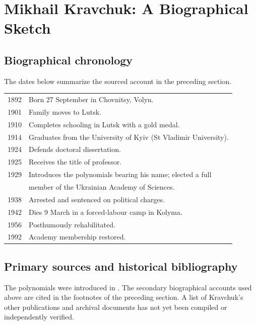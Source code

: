 \chapter{Mikhail Kravchuk: A Biographical Sketch}
\label{app:biography}


\section{Biographical chronology}
The dates below summarize the sourced account in the preceding section.
\begin{center}
\begin{tabular}{rl}
1892 & Born 27 September in Chovnitsy, Volyn.\\
1901 & Family moves to Lutsk.\\
1910 & Completes schooling in Lutsk with a gold medal.\\
1914 & Graduates from the University of Kyiv (St Vladimir University).\\
1924 & Defends doctoral dissertation.\\
1925 & Receives the title of professor.\\
1929 & Introduces the polynomials bearing his name; elected a full\\
     & member of the Ukrainian Academy of Sciences.\\
1938 & Arrested and sentenced on political charges.\\
1942 & Dies 9 March in a forced-labour camp in Kolyma.\\
1956 & Posthumously rehabilitated.\\
1992 & Academy membership restored.
\end{tabular}
\end{center}

\section{Primary sources and historical bibliography}
The polynomials were introduced in \cite{ref28}. The secondary
biographical accounts used above are cited in the footnotes of the
preceding section. A list of Kravchuk's other publications and archival
documents has not yet been compiled or independently verified.
